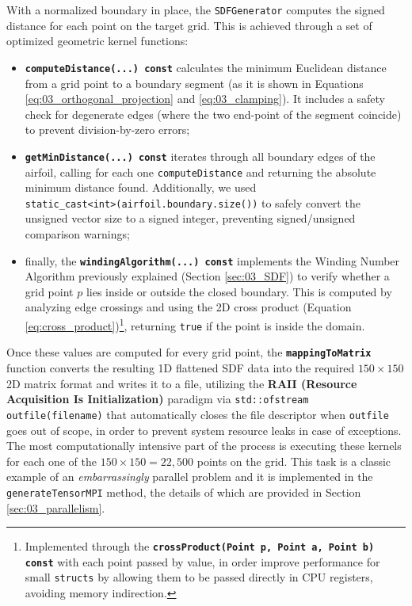 With a normalized boundary in place, the \texttt{SDFGenerator} computes the signed distance for each point on the target grid. This is achieved through a set of optimized geometric kernel functions:
\begin{itemize}
    \item[-] \textbf{\texttt{computeDistance(...) const}} calculates the minimum Euclidean distance from a grid point to a boundary segment (as it is shown in Equations \eqref{eq:03_orthogonal_projection} and \eqref{eq:03_clamping}). It includes a safety check for degenerate edges (where the two end-point of the segment coincide) to prevent division-by-zero errors;
    \item[-] \textbf{\texttt{getMinDistance(...) const}} iterates through all boundary edges of the airfoil, calling for each one \texttt{computeDistance} and returning the absolute minimum distance found. Additionally, we used \\\texttt{static\_cast<int>(airfoil.boundary.size())} to safely convert the unsigned vector size to a signed integer, preventing signed/unsigned comparison warnings;
    \item[-] finally, the \textbf{\texttt{windingAlgorithm(...) const}} implements the Winding Number Algorithm previously explained (Section \ref{sec:03_SDF}) to verify whether a grid point $p$ lies inside or outside the closed boundary. This is computed by analyzing edge crossings and using the 2D cross product (Equation \eqref{eq:cross_product})\footnote{Implemented through the \textbf{\texttt{crossProduct(Point p, Point a, Point b) const}} with each point passed by value, in order improve performance for small \texttt{structs} by allowing them to be passed directly in CPU registers, avoiding memory indirection.}, returning \texttt{true} if the point is inside the domain.
\end{itemize}
\vspace{2ex}

Once these values are computed for every grid point, the \textbf{\texttt{mappingToMatrix}} function converts the resulting 1D flattened SDF data into the required $150 \times 150$ 2D matrix format and writes it to a file, utilizing the \textbf{RAII (Resource Acquisition Is Initialization)} paradigm via \texttt{std::ofstream outfile(filename)} that automatically closes the file descriptor when \texttt{outfile} goes out of scope, in order to prevent system resource leaks in case of exceptions.\\

The most computationally intensive part of the process is executing these kernels for each one of the $150 \times 150 = 22,500$ points on the grid. This task is a classic example of an \textit{embarrassingly} parallel problem and it is implemented in the \texttt{generateTensorMPI} method, the details of which are provided in Section \ref{sec:03_parallelism}.

